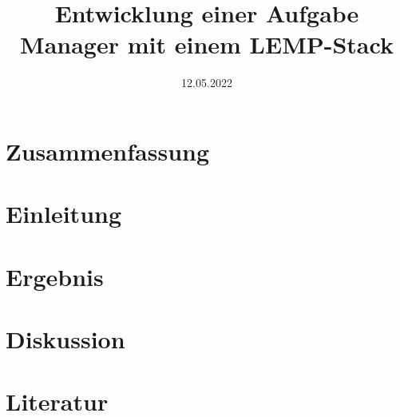 \documentclass[a4paper,10pt,twoside]{scrartcl}
\title{Entwicklung einer Aufgabe Manager mit einem LEMP-Stack}
\date{12.05.2022}
\begin{document}


\tableofcontents

\newpage


\section{Zusammenfassung}

\section{Einleitung}

\section{Ergebnis}

\section{Diskussion}

\section{Literatur}

\end{document}
